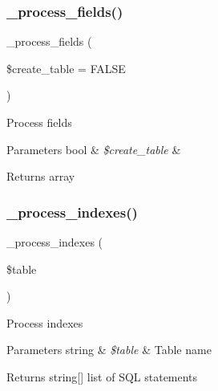 \subsubsection{\texorpdfstring{\+\_\+process\+\_\+fields()}{\_process\_fields()}}
{\footnotesize\ttfamily \+\_\+process\+\_\+fields (\begin{DoxyParamCaption}\item[{}]{\$create\+\_\+table = {\ttfamily FALSE} }\end{DoxyParamCaption})\hspace{0.3cm}{\ttfamily [protected]}}

Process fields


\begin{DoxyParams}[1]{Parameters}
bool & {\em \$create\+\_\+table} & \\
\hline
\end{DoxyParams}
\begin{DoxyReturn}{Returns}
array 
\end{DoxyReturn}
\mbox{\label{class_c_i___d_b__forge_ae0bdb4ea3418590d1894c5b621b5ca50}} 
\subsubsection{\texorpdfstring{\+\_\+process\+\_\+indexes()}{\_process\_indexes()}}
{\footnotesize\ttfamily \+\_\+process\+\_\+indexes (\begin{DoxyParamCaption}\item[{}]{\$table }\end{DoxyParamCaption})\hspace{0.3cm}{\ttfamily [protected]}}

Process indexes


\begin{DoxyParams}[1]{Parameters}
string & {\em \$table} & Table name \\
\hline
\end{DoxyParams}
\begin{DoxyReturn}{Returns}
string\mbox{[}\mbox{]} list of S\+QL statements 
\end{DoxyReturn}
\mbox{\label{class_c_i___d_b__forge_a207c32e2b5c14364b2e33d2f15500b7e}} 
